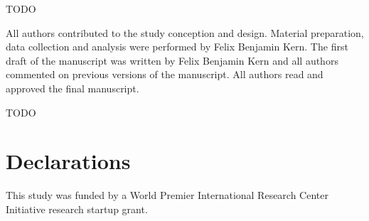 \documentclass[pdflatex,referee,iicol,sn-basic]{sn-jnl}
\theoremstyle{thmstyleone}%
\theoremstyle{thmstyletwo}%
\theoremstyle{thmstylethree}%
\begin{document}








\backmatter

TODO

All authors contributed to the study conception and design. Material preparation, data collection and analysis were performed by Felix Benjamin Kern. The first draft of the manuscript was written by Felix Benjamin Kern and all authors commented on previous versions of the manuscript. All authors read and approved the final manuscript.

TODO

\section*{Declarations}

This study was funded by a World Premier International Research Center Initiative research startup grant.
\end{document}
